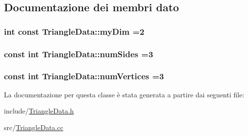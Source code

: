\subsection{Documentazione dei membri dato}
\hypertarget{classTriangleData_aba0f696d79a127708f9cd73ffaa13ec9}{
\subsubsection[{my\-Dim}]{\setlength{\rightskip}{0pt plus 5cm}int const Triangle\-Data\-::my\-Dim =2\hspace{0.3cm}{\ttfamily [static]}}}\label{classTriangleData_aba0f696d79a127708f9cd73ffaa13ec9}
\hypertarget{classTriangleData_a9c499ade75343930cf6722c8e39d9485}{
\subsubsection[{num\-Sides}]{\setlength{\rightskip}{0pt plus 5cm}const int Triangle\-Data\-::num\-Sides =3\hspace{0.3cm}{\ttfamily [static]}}}\label{classTriangleData_a9c499ade75343930cf6722c8e39d9485}
\hypertarget{classTriangleData_a30d9f452a2cab5b864084d13b7076908}{
\subsubsection[{num\-Vertices}]{\setlength{\rightskip}{0pt plus 5cm}const int Triangle\-Data\-::num\-Vertices =3\hspace{0.3cm}{\ttfamily [static]}}}\label{classTriangleData_a30d9f452a2cab5b864084d13b7076908}


La documentazione per questa classe è stata generata a partire dai seguenti file\-:\begin{DoxyCompactItemize}
\item 
include/\hyperlink{TriangleData_8h}{Triangle\-Data.\-h}\item 
src/\hyperlink{TriangleData_8cc}{Triangle\-Data.\-cc}\end{DoxyCompactItemize}
